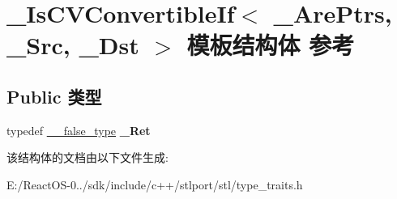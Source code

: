 \hypertarget{struct___is_c_v_convertible_if}{}\section{\+\_\+\+Is\+C\+V\+Convertible\+If$<$ \+\_\+\+Are\+Ptrs, \+\_\+\+Src, \+\_\+\+Dst $>$ 模板结构体 参考}
\label{struct___is_c_v_convertible_if}
\subsection*{Public 类型}
\begin{DoxyCompactItemize}
\item 
\mbox{\label{struct___is_c_v_convertible_if_ad3534c1b4737c8f4f9d1476317198337}} 
typedef \hyperlink{struct____false__type}{\+\_\+\+\_\+false\+\_\+type} {\bfseries \+\_\+\+Ret}
\end{DoxyCompactItemize}


该结构体的文档由以下文件生成\+:\begin{DoxyCompactItemize}
\item 
E\+:/\+React\+O\+S-\/0../sdk/include/c++/stlport/stl/type\+\_\+traits.\+h\end{DoxyCompactItemize}
